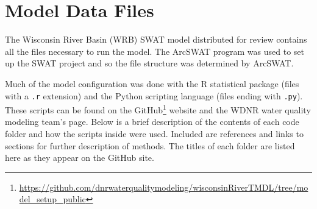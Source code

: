 \section{Model Data Files}
\label{sec:model_data}
The Wisconsin River Basin (WRB) SWAT model distributed for review contains all the files necessary to run the model. The ArcSWAT program was used to set up the SWAT project and so the file structure was determined by ArcSWAT. 

Much of the model configuration was done with the R statistical package (files with a \texttt{.r} extension) and the Python scripting language (files ending with \texttt{.py}). These scripts can be found on the GitHub\footnote{\url{https://github.com/dnrwaterqualitymodeling/wisconsinRiverTMDL/tree/model_setup_public}} website and the WDNR water quality modeling team's page. Below is a brief description of the contents of each code folder and how the scripts inside were used. Included are references and links to sections for further description of methods. The titles of each folder are listed here as they appear on the GitHub site.

